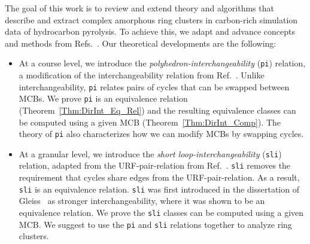 \documentclass[fleqn,11pt]{article}
\begin{document}
{The goal of this work} is to review and extend theory and algorithms that describe and extract complex amorphous ring clusters in carbon-rich simulation data of hydrocarbon pyrolysis. To achieve this, we adapt and advance concepts and methods from Refs.~\cite{gleissInterchangeability2000,kolodzikUnique2012}. 
Our theoretical developments are the following:
\begin{itemize}
	\item 
	At a course level, we introduce the \emph{polyhedron-interchangeability} ({\tt pi}) relation, a modification of the interchangeability relation from Ref.~\cite{gleissInterchangeability2000}.
	Unlike interchangeability, {\tt pi} relates pairs of cycles that can be swapped between MCBs. We prove {\tt pi} is an equivalence relation (Theorem~\ref{Thm:DirInt_Eq_Rel}) and the resulting equivalence classes can be computed using a given MCB (Theorem~\ref{Thm:DirInt_Comp}). The theory of {\tt pi} also characterizes how we can modify MCBs by swapping cycles.
	\item At a granular level, we introduce the \emph{short loop-interchangeability} ({\tt sli}) relation, adapted from the URF-pair-relation from Ref.~\cite{kolodzikUnique2012}. {\tt sli} removes the requirement that cycles share edges from the URF-pair-relation. As a result, {\tt sli} is an equivalence relation. 
	{\tt sli} was first introduced in the dissertation of Gleiss~\cite{gleissShort2001} as stronger interchangeability, where it was shown to be an equivalence relation. 
	We prove the {\tt sli} classes can be computed using a given MCB. 
	We suggest to use the {\tt pi} and {\tt sli} relations together to analyze ring clusters.
\end{itemize}


\end{document}
